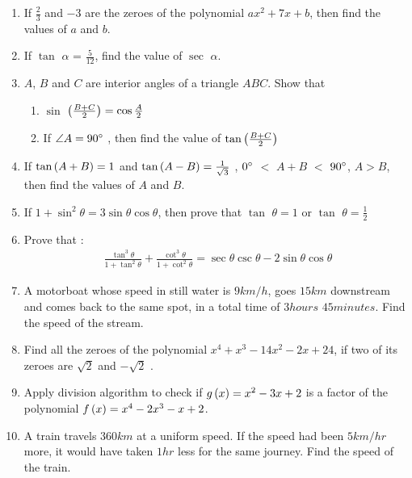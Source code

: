 \begin{enumerate}
\item If $\frac{2}{3}$ and $-3$ are the zeroes of the polynomial $ax^2 + 7x + b$, then find the values of $a$ and $b$.

\item If $\tan$ $\alpha$ = ${\frac {5}{12}}$, find the value of $\sec$ $\alpha$.

\item $A$, $B$ and $C$ are interior angles of a triangle $ABC$. Show that
\begin{enumerate}
\item  $\sin$ $ \left({\frac {B+C}{2}}\right) = \cos {\frac {A}{2}}$
\item  If $\angle A = 90 \degree$ , then find the value of $\tan \left({\frac{B+C}{2}}\right)$ 
\end{enumerate} 

\item If $\tan \left(A + B\right) = 1$ and $\tan \left(A - B\right) = \frac{1}{\sqrt{3}}$ , $0\degree$ $<$ $A + B$ $<$ $90\degree$, $A > B$, then find the values of $A$ and $B$.

\item If $1 + \sin^2 \theta  = 3 \sin \theta \cos \theta$, then prove that $\tan$ $\theta = 1 $ or $\tan$ $\theta = \frac{1}{2}$

\item Prove that :
\begin{align*}
\frac{\tan^3 \theta}{1+\tan^2 \theta} + \frac{\cot^3 \theta}{1 + \cot^2 \theta} =  \sec \theta  \csc  \theta - 2 \sin \theta \cos \theta  
\end{align*}

\item A motorboat whose speed in still water is $9 km/h $, goes $15km$ downstream and comes back to the same spot, in a total time of $3 hours$ $45 minutes$. Find the speed of the stream.


\item Find all the zeroes of the polynomial $x^4 + x^3- 14x^2 -2x + 24$, if two of its zeroes are $\sqrt2$ and $-\sqrt 2$ .

\item Apply division algorithm to check if $g\left(x\right) = x^2 - 3x + 2$ is a factor of the polynomial $f\left(x\right) = x^4 - 2x^3 - x + 2$.


\item A train travels $360 km$ at a uniform speed. If the speed had been $5 km/hr$ more, it would have taken $1 hr$ less for the same journey. Find the speed of the train.


\end{enumerate}

